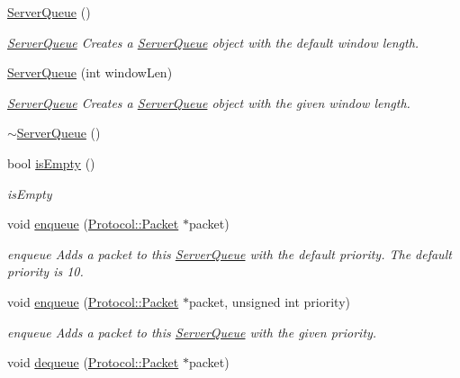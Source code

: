 \begin{DoxyCompactItemize}
\item 
\hyperlink{class_server_queue_a5a03695a07bd1fe30cf6c2e58f6f8b1e}{Server\+Queue} ()
\begin{DoxyCompactList}\small\item\em \hyperlink{class_server_queue}{Server\+Queue} Creates a \hyperlink{class_server_queue}{Server\+Queue} object with the default window length. \end{DoxyCompactList}\item 
\hyperlink{class_server_queue_a05f53c129a6c445e869904eab8504888}{Server\+Queue} (int window\+Len)
\begin{DoxyCompactList}\small\item\em \hyperlink{class_server_queue}{Server\+Queue} Creates a \hyperlink{class_server_queue}{Server\+Queue} object with the given window length. \end{DoxyCompactList}\item 
\hyperlink{class_server_queue_a59cd46b536b9e86f7c7d93519d5bd983}{$\sim$\+Server\+Queue} ()
\item 
bool \hyperlink{class_server_queue_aa8335eeeaf56fbe703cb49988b63fb87}{is\+Empty} ()
\begin{DoxyCompactList}\small\item\em is\+Empty \end{DoxyCompactList}\item 
void \hyperlink{class_server_queue_a715921b0a0067b3d3a1485a824fbbb3d}{enqueue} (\hyperlink{class_protocol_1_1_packet}{Protocol\+::\+Packet} $\ast$packet)
\begin{DoxyCompactList}\small\item\em enqueue Adds a packet to this \hyperlink{class_server_queue}{Server\+Queue} with the default priority. The default priority is 10. \end{DoxyCompactList}\item 
void \hyperlink{class_server_queue_a9438c6df4c203a32533d3388ae313195}{enqueue} (\hyperlink{class_protocol_1_1_packet}{Protocol\+::\+Packet} $\ast$packet, unsigned int priority)
\begin{DoxyCompactList}\small\item\em enqueue Adds a packet to this \hyperlink{class_server_queue}{Server\+Queue} with the given priority. \end{DoxyCompactList}\item 
void \hyperlink{class_server_queue_aa8678274d8afa980b2995ed3f839a3f8}{dequeue} (\hyperlink{class_protocol_1_1_packet}{Protocol\+::\+Packet} $\ast$packet)

\end{DoxyCompactItemize}
